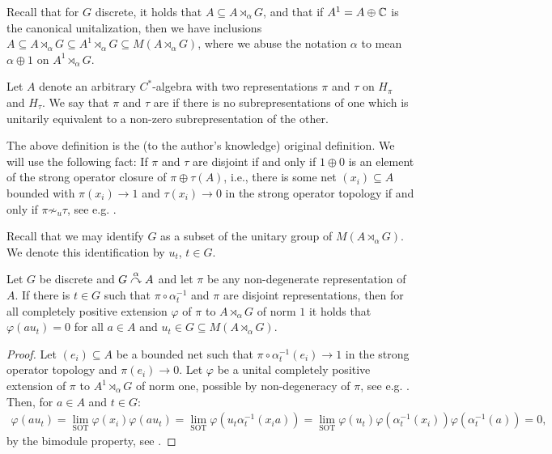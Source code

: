 Recall that for $G$ discrete, it holds that $A \subseteq A \rtimes_\alpha G$, and that if $A^1 = A \oplus \mathbb{C}$ is the canonical unitalization, then we have inclusions $ A \subseteq A \rtimes_\alpha G  \subseteq A^1 \rtimes_\alpha G \subseteq M(A \rtimes_\alpha G)$, where we abuse the notation $\alpha$ to mean $\alpha \oplus 1$ on $A^1 \rtimes_\alpha G$.
\begin{definition}
	Let $A$ denote an arbitrary $C^*$-algebra with two representations $\pi$ and $\tau$ on $H_\pi$ and $H_\tau$. We say that $\pi$ and $\tau$ are  if there is no subrepresentations of one which is unitarily equivalent to a non-zero subrepresentation of the other.
\end{definition}
\begin{remark}
	The above definition is the (to the author's knowledge) original definition. We will use the following fact: If $\pi$ and $\tau$ are disjoint if and only if $1 \oplus 0$ is an element of the strong operator closure of $\pi \oplus \tau (A)$, i.e., there is some net $(x_i) \subseteq A$ bounded with $\pi(x_i) \to 1$ and $\tau(x_i) \to 0$ in the strong operator topology if and only if  $\pi \not \sim _u \tau$, see e.g. \cite[Proposition 2.1.4]{arveson2012invitation}. 
\end{remark}
Recall that we may identify $G$ as a subset of the unitary group of $M(A \rtimes_\alpha G)$. We denote this identification by $u_t$, $t \in G$. 
\begin{lemma}
	Let $G$ be discrete and $G \stackrel{\alpha}{\curvearrowright} A$ and let $\pi$ be any non-degenerate representation of $A$. If there is $t \in G$ such that $\pi \circ \alpha_t^{-1}$ and $\pi$ are disjoint representations, then for all completely positive extension $\varphi$ of $\pi$ to $A \rtimes_\alpha G$ of norm $1$ it holds that $\varphi(a u_t) = 0$ for all $a \in A$ and $u_t \in G \subseteq M(A \rtimes_\alpha G)$.
	\label{ASlem1}
\end{lemma}
\begin{proof}
	Let $(e_i) \subseteq A$ be a bounded net such that $\pi  \circ \alpha_{t}^{-1}(e_i) \to 1$ in the strong operator topology and $\pi(e_i) \to 0$. Let $\varphi$ be a unital completely positive extension of $\pi$ to $A^1  \rtimes_\alpha G$ of norm one, possible by non-degeneracy of $\pi$, see e.g. \cite[Proposition 2.2.1]{brown2008c}. Then, for $a \in A$ and $t \in G$:
	\begin{align*}
		\varphi(a u_t) = \lim_{\text{SOT}} \varphi(x_i )\varphi(a u_t) = \lim_{\text{SOT}} \varphi(u_t \alpha_{t}^{-1}(x_i a )) = \lim_{\text{SOT}} \varphi(u_t) \varphi(\alpha_t^{-1}(x_i))\varphi(\alpha_{t}^{-1}(a)) = 0,
	\end{align*}
	by the bimodule property, see \cite[Proposition 1.5.7 p.t (2)]{brown2008c}.
\end{proof}
